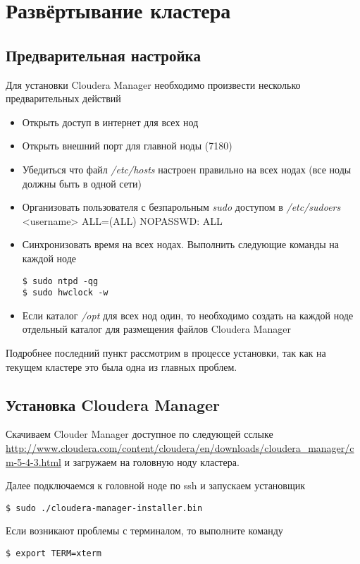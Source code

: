 \chapter{Развёртывание кластера}
\section{Предварительная настройка}
Для установки Cloudera Manager необходимо произвести несколько предварительных действий
\begin{itemize}
    \item Открыть доступ в интернет для всех нод
    \item Открыть внешний порт для главной ноды (7180)
    \item Убедиться что файл \emph{/etc/hosts} настроен правильно на всех нодах
        (все ноды должны быть в одной сети)
    \item Организовать пользователя с безпарольным \emph{sudo} доступом в \emph{/etc/sudoers}\\
        <username> ALL=(ALL) NOPASSWD: ALL
    \item Синхронизовать время на всех нодах. Выполнить следующие команды на каждой ноде
\begin{lstlisting}
$ sudo ntpd -qg
$ sudo hwclock -w
\end{lstlisting}
    \item Если каталог \emph{/opt} для всех нод один, то необходимо создать на каждой ноде отдельный 
        каталог для размещения файлов Cloudera Manager
\end{itemize}
Подробнее последний пункт рассмотрим в процессе установки, так как на текущем кластере это была одна из 
главных проблем.

\newpage

\section{Установка Cloudera Manager}
Скачиваем Clouder Manager доступное по следующей сслыке 
\url{http://www.cloudera.com/content/cloudera/en/downloads/cloudera_manager/cm-5-4-3.html} и 
загружаем на головную ноду кластера.

Далее подключаемся к головной ноде по ssh и запускаем установщик
\begin{lstlisting}
$ sudo ./cloudera-manager-installer.bin
\end{lstlisting}

Если возникают проблемы с терминалом, то выполните команду
\begin{lstlisting}
$ export TERM=xterm
\end{lstlisting}

